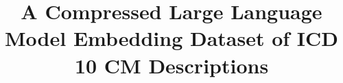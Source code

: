 \documentclass{bmcart}
\begin{document}
\begin{frontmatter}

\begin{fmbox}


\title{A Compressed Large Language Model Embedding Dataset of ICD 10 CM 
Descriptions}


\author[
  addressref={aff1},                   %
  corref={aff1},                       %
  email={michael.kane@yale.edu}   %
]{ }
\author[
  addressref={aff1},
  email={denise.esserman@yale.edu}
]{ }
\author[
  addressref={aff2},
  email={nklatham@bwh.harvard.edu}
]{ }
\author[
  addressref={aff1},
  email={erich.greene@yale.edu}
]{ }
\author[
  addressref={aff3},
  email={dganz@mednet.ucla.edu}
]{ }


\address[id=aff1]{%
  ,       %
  ,          %
  ,
  ,                              %
}
\address[id=aff2]{%
  ,
  ,
}
\address[id=aff3]{%
  ,
  ,
}


\end{fmbox}
\end{frontmatter}
\end{document}
